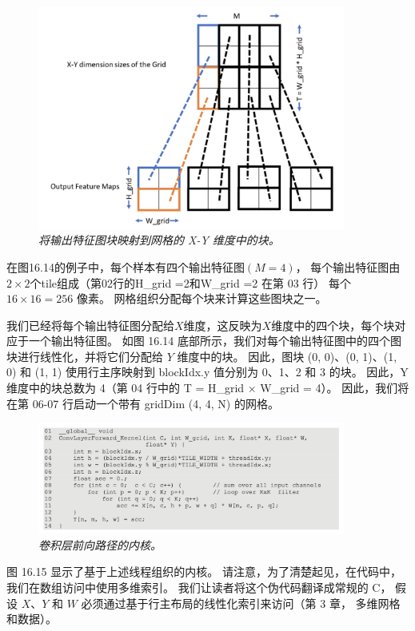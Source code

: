 \begin{figure}[H]
	\centering
	\includegraphics[width=0.9\textwidth]{figs/F16.14.png}
	\caption{\textit{将输出特征图块映射到网格的 X-Y 维度中的块。}}
\end{figure}

在图16.14的例子中，每个样本有四个输出特征图$(M=4)$，
每个输出特征图由$2 \times 2$个tile组成（第02行的H\_grid =2和W\_grid =2 在第 03 行）
每个 $16 \times 16=256$ 像素。 网格组织分配每个块来计算这些图块之一。

我们已经将每个输出特征图分配给$X$维度，这反映为$X$维度中的四个块，每个块对应于一个输出特征图。 
如图 16.14 底部所示，我们对每个输出特征图中的四个图块进行线性化，并将它们分配给 $Y$ 维度中的块。 
因此，图块 (0, 0)、(0, 1)、(1, 0) 和 (1, 1) 使用行主序映射到 blockIdx.y 值分别为 0、1、2 和 3 的块。 
因此，Y 维度中的块总数为 4（第 04 行中的 T = H\_grid × W\_grid = 4）。 
因此，我们将在第 06-07 行启动一个带有 gridDim (4, 4, N) 的网格。

\begin{figure}[H]
	\centering
	\includegraphics[width=0.9\textwidth]{figs/F16.15.png}
	\caption{\textit{卷积层前向路径的内核。}}
\end{figure}

图 16.15 显示了基于上述线程组织的内核。 请注意，为了清楚起见，在代码中，我们在数组访问中使用多维索引。 
我们让读者将这个伪代码翻译成常规的 $\mathrm{C}$，
假设 $X、Y$ 和 $W$ 必须通过基于行主布局的线性化索引来访问（第 3 章， 多维网格和数据）。

